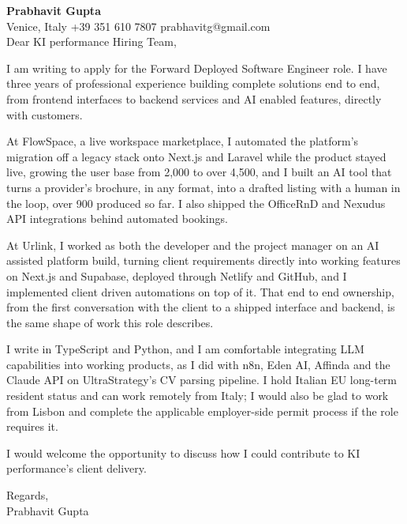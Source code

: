 \documentclass[a4paper,10.5pt]{article}
\begin{document}
\textbf{Prabhavit Gupta}\\
Venice, Italy \textbar{} +39 351 610 7807 \textbar{} prabhavitg@gmail.com\\[10pt]
Dear KI performance Hiring Team,

I am writing to apply for the Forward Deployed Software Engineer role. I have three years of professional experience building complete solutions end to end, from frontend interfaces to backend services and AI enabled features, directly with customers.

At FlowSpace, a live workspace marketplace, I automated the platform's migration off a legacy stack onto Next.js and Laravel while the product stayed live, growing the user base from 2,000 to over 4,500, and I built an AI tool that turns a provider's brochure, in any format, into a drafted listing with a human in the loop, over 900 produced so far. I also shipped the OfficeRnD and Nexudus API integrations behind automated bookings.

At Urlink, I worked as both the developer and the project manager on an AI assisted platform build, turning client requirements directly into working features on Next.js and Supabase, deployed through Netlify and GitHub, and I implemented client driven automations on top of it. That end to end ownership, from the first conversation with the client to a shipped interface and backend, is the same shape of work this role describes.

I write in TypeScript and Python, and I am comfortable integrating LLM capabilities into working products, as I did with n8n, Eden AI, Affinda and the Claude API on UltraStrategy's CV parsing pipeline. I hold Italian EU long-term resident status and can work remotely from Italy; I would also be glad to work from Lisbon and complete the applicable employer-side permit process if the role requires it.

I would welcome the opportunity to discuss how I could contribute to KI performance's client delivery.

Regards,\\
Prabhavit Gupta
\end{document}
